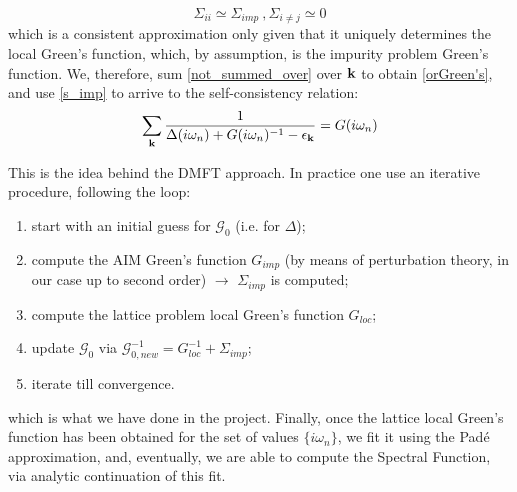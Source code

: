\begin{equation}
\Sigma_{ii} \simeq \Sigma_{imp} ~ , \Sigma_{i\neq j} \simeq 0
\end{equation}
which is a consistent approximation only given that it uniquely determines the local Green's function, which, by assumption, is the impurity problem Green's function. We, therefore, sum \eqref{not_summed_over} over $\bold{k}$ to obtain \eqref{orGreen's}, and use \eqref{s_imp} to arrive to the self-consistency relation:
\begin{equation}
\sum_\bold{k}\frac{1}{\Delta(i\omega_n)+G(i\omega_n)^{-1}-\epsilon_\bold{k}} = G(i\omega_n)
\end{equation}

This is the idea behind the DMFT approach. In practice one use an iterative procedure, following the loop: 
\begin{enumerate}
\item start with an initial guess for $\mathscr{G}_0$ (i.e. for $\Delta$);
\item compute the AIM Green's function $G_{imp}$ (by means of perturbation theory, in our case up to second order) $\rightarrow$ $\Sigma_{imp}$ is computed;
\item compute the lattice problem local Green's function $G_{loc}$;
\item update $\mathscr{G}_0$ via $\mathscr{G}_{0,new}^{-1} = G_{loc}^{-1} + \Sigma_{imp}$;
\item iterate till convergence.
\end{enumerate}
which is what we have done in the project. Finally, once the lattice local Green's function has been obtained for the set of values $\{i\omega_n\}$, we fit it using the Padé approximation, and, eventually, we are able to compute the Spectral Function, via analytic continuation of this fit.


